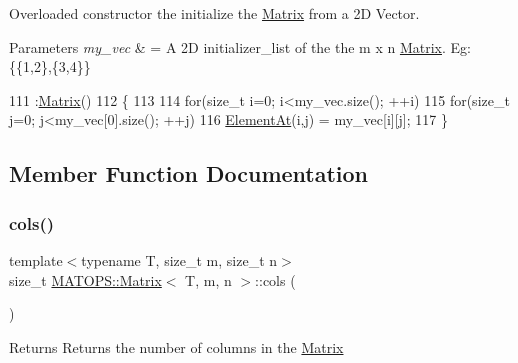 Overloaded constructor the initialize the \hyperlink{classMATOPS_1_1Matrix}{Matrix} from a 2D Vector. 


\begin{DoxyParams}{Parameters}
{\em my\+\_\+vec} & = A 2D initializer\+\_\+list of the the m x n \hyperlink{classMATOPS_1_1Matrix}{Matrix}. Eg\+: \{\{1,2\},\{3,4\}\} \\
\hline
\end{DoxyParams}

\begin{DoxyCode}
111                                                                 :\hyperlink{classMATOPS_1_1Matrix_ab714719c18d79c8d0480d0665ff56609}{Matrix}()
112                         \{
113 
114                                 \textcolor{keywordflow}{for}(\textcolor{keywordtype}{size\_t} i=0; i<my\_vec.size(); ++i)
115                                         \textcolor{keywordflow}{for}(\textcolor{keywordtype}{size\_t} j=0; j<my\_vec[0].size(); ++j)
116                                                 \hyperlink{classMATOPS_1_1Matrix_a9eabd6b452bd01040c9ecaadc2ad6562}{ElementAt}(i,j) = my\_vec[i][j];
117                         \}
\end{DoxyCode}


\subsection{Member Function Documentation}
\mbox{\label{classMATOPS_1_1Matrix_a4fde0b19d8cd6ca18c24d836355a2e5a}} 
\subsubsection{\texorpdfstring{cols()}{cols()}}
{\footnotesize\ttfamily template$<$typename T, size\+\_\+t m, size\+\_\+t n$>$ \\
size\+\_\+t \hyperlink{classMATOPS_1_1Matrix}{M\+A\+T\+O\+P\+S\+::\+Matrix}$<$ T, m, n $>$\+::cols (\begin{DoxyParamCaption}{ }\end{DoxyParamCaption})\hspace{0.3cm}{\ttfamily [inline]}}

\begin{DoxyReturn}{Returns}
Returns the number of columns in the \hyperlink{classMATOPS_1_1Matrix}{Matrix} 
\end{DoxyReturn}

